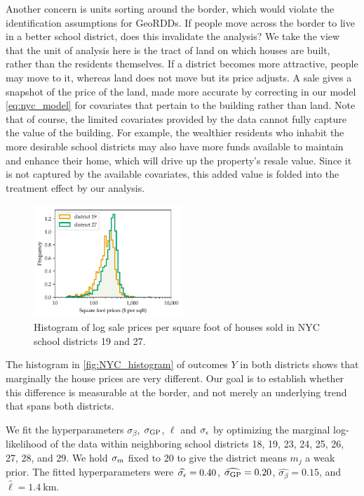 Another concern is units sorting around the border, which would violate the identification assumptions for GeoRDDs.
If people move across the border to live in a better school district, does this invalidate the analysis?
We take the view that the unit of analysis here is the tract of land on which houses are built, rather than the residents themselves.
If a district becomes more attractive, people may move to it, whereas land does not move but its price adjusts.
A sale gives a snapshot of the price of the land, made more accurate by correcting in our model \autoref{eq:nyc_model} for covariates that pertain to the building rather than land.
Note that of course, the limited covariates provided by the data cannot fully capture the value of the building.
For example, the wealthier residents who inhabit the more desirable school districts may also have more funds available to maintain and enhance their home, which will drive up the property's resale value.
Since it is not captured by the available covariates, this added value is folded into the treatment effect by our analysis.

\begin{figure}[tb]
    \centering
    \includegraphics[width=0.5\textwidth]{../NYC/NYC_plots/sales_histogram_19-27.pdf}
    \caption{\label{fig:NYC_histogram}Histogram of log sale prices per square foot of houses sold in NYC school districts 19 and 27.}
\end{figure}

The histogram in \autoref{fig:NYC_histogram} of outcomes \(Y\) in both districts shows that marginally the house prices are very different.
Our goal is to establish whether this difference is measurable at the border, and not merely an underlying trend that spans both districts.

We fit the hyperparameters \(\sigma_\beta\), \(\sigma_{\mathrm{GP}}\), \(\ell\) and \(\sigma_{\epsilon}\) by optimizing the marginal log-likelihood of the data within neighboring school districts 18, 19, 23, 24, 25, 26, 27, 28, and 29.
We hold \(\sigma_{m}\) fixed to 20 to give the district means \(m_j\) a weak prior.
The fitted hyperparameters were \(\widehat{\sigma_{\epsilon}}=0.40\), \(\widehat{\sigma_{\mathrm{GP}}}=0.20\), \(\widehat{\sigma_\beta}=0.15\), and \(\widehat{\ell}=1.4~\text{km}\).

